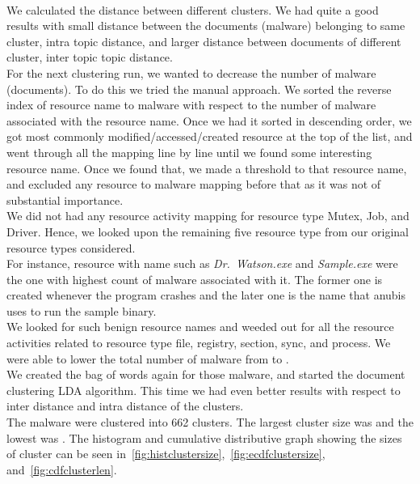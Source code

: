 \\
We calculated the distance between different clusters. We had quite a good results with small distance between the documents (malware) belonging to same cluster, intra topic distance, and larger distance between documents of different cluster, inter topic topic distance.
\\
For the next clustering run, we wanted to decrease the number of malware (documents).
To do this we tried the manual approach. We sorted the reverse index of resource name to malware with respect to the number of malware associated with the resource name.
Once we had it sorted in descending order, we got most commonly modified/accessed/created resource at the top of the list, and went through all the mapping line by line until we found some interesting resource name.
Once we found that, we made a threshold to that resource name, and excluded any resource to malware mapping before that as it was not of substantial importance.\\
We did not had any resource activity mapping for resource type Mutex, Job, and Driver. Hence, we looked upon the remaining five resource type from our original resource types considered.\\
For instance, resource with name such as \emph{Dr.\ Watson.exe} and \emph{Sample.exe} were the one with highest count of malware associated with it. The former one is created whenever the program crashes and the later one is the name that anubis uses to run the sample binary.\\
We looked for such benign resource names and weeded out for all the resource activities related to resource type file, registry, section, sync, and process. We were able to lower the total number of malware from {\gettotalmalwareii{}} to {\gettotalmalwareiii{}}.\\
We created the bag of words again for those {\gettotalmalwareiii{}} malware, and started the document clustering LDA algorithm. This time we had even better results with respect to inter distance and intra distance of the clusters.\\
The malware were clustered into 662 clusters. The largest cluster size was {\getlargestclustersize{}} and the lowest was {\getlowestclustersize{}}.
The histogram and cumulative distributive graph showing the sizes of cluster can be seen in~\ref{fig:histclustersize},~\ref{fig:ecdfclustersize}, and~\ref{fig:cdfclusterlen}.\\
